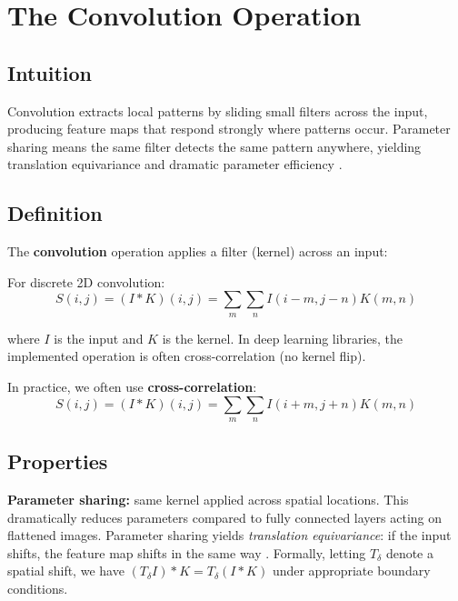 
\section{The Convolution Operation}
\label{sec:convolution}


\subsection*{Intuition}
Convolution extracts local patterns by sliding small filters across the input, producing feature maps that respond strongly where patterns occur. Parameter sharing means the same filter detects the same pattern anywhere, yielding translation equivariance  and dramatic parameter efficiency \cite{GoodfellowEtAl2016,Prince2023}.

\subsection{Definition}

The \textbf{convolution} operation applies a filter (kernel) across an input:

For discrete 2D convolution:
\begin{equation}
S(i,j) = (I * K)(i,j) = \sum_m \sum_n I(i-m, j-n) K(m, n)
\end{equation}

where $I$ is the input and $K$ is the kernel. In deep learning libraries, the implemented operation is often cross-correlation (no kernel flip).

In practice, we often use \textbf{cross-correlation}:
\begin{equation}
S(i,j) = (I * K)(i,j) = \sum_m \sum_n I(i+m, j+n) K(m, n)
\end{equation}

\subsection{Properties}

\textbf{Parameter sharing:} same kernel applied across spatial locations. This dramatically reduces parameters compared to fully connected layers acting on flattened images. Parameter sharing yields \emph{translation equivariance}: if the input shifts, the feature map shifts in the same way \cite{GoodfellowEtAl2016,Prince2023}. Formally, letting \(T_\delta\) denote a spatial shift, we have \((T_\delta I) * K = T_\delta (I * K)\) under appropriate boundary conditions.

